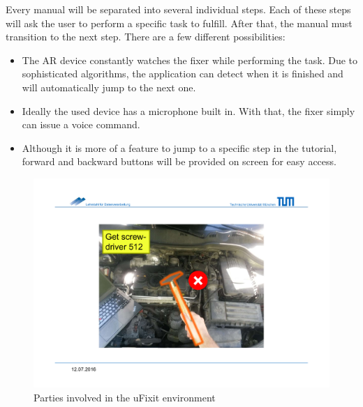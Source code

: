 		Every manual will be separated into several individual steps. Each of these steps will ask the user to perform a specific task to fulfill. After that, the manual must transition to the next step. There are a few different possibilities:
		
		\begin{itemize}
			\itemsep0em
			\item The AR device constantly watches the fixer while performing the task. Due to sophisticated algorithms, the application can detect when it is finished and will automatically jump to the next one.
			\item Ideally the used device has a microphone built in. With that, the fixer simply can issue a voice command.
			\item Although it is more of a feature to jump to a specific step in the tutorial, forward and backward buttons will be provided on screen for easy access.
		\end{itemize}
		
		
		
		\begin{figure}[H]
			\includegraphics[width=\textwidth, trim=4cm 3cm 4cm 4cm, clip]{../images/instr-hammer.pdf}
			\centering
			\caption{Parties involved in the uFixit environment}
			\label{fig:instr-hammer}
		\end{figure}
		

